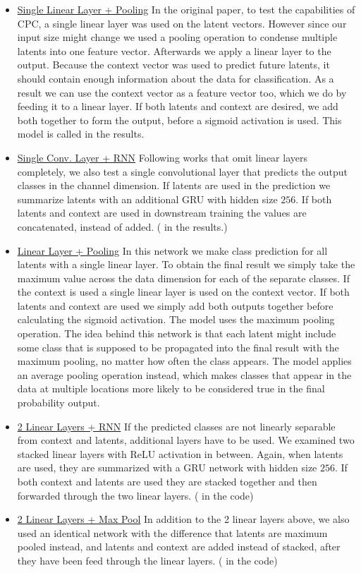 \begin{itemize}
	\item \underline{Single Linear Layer + Pooling} In the original paper, to test the capabilities of CPC, a single linear layer was used on the latent vectors. However since our input size might change we used a pooling operation to condense multiple latents into one feature vector. Afterwards we apply a linear layer to the output. Because the context vector was used to predict future latents, it should contain enough information about the data for classification. As a result we can use the context vector as a feature vector too, which we do by feeding it to a linear layer. If both latents and context are desired, we add both together to form the output, before a sigmoid activation is used. This model is called  in the results.
	\item \underline{Single Conv. Layer + RNN} Following works that omit linear layers completely, we also test a single convolutional layer that predicts the output classes in the channel dimension. If latents are used in the prediction we summarize latents with an additional GRU with hidden size $256$. If both latents and context are used in downstream training the values are concatenated, instead of added. ( in the results.)
	\item \underline{Linear Layer + Pooling} In this network we make class prediction for all latents with a single linear layer. To obtain the final result we simply take the maximum value across the data dimension for each of the separate classes. If the context is used a single linear layer is used on the context vector. If both latents and context are used we simply add both outputs together before calculating the sigmoid activation. The model  uses the maximum pooling operation. The idea behind this network is that each latent might include some class that is supposed to be propagated into the final result with the maximum pooling, no matter how often the class appears. The model  applies an average pooling operation instead, which makes classes that appear in the data at multiple locations more likely to be considered true in the final probability output.
	\item \underline{2 Linear Layers + RNN} If the predicted classes are not linearly separable from context and latents, additional layers have to be used. We examined two stacked linear layers with ReLU activation in between. Again, when latents are used, they are summarized with a GRU network with hidden size $256$. If both context and latents are used they are stacked together and then forwarded through the two linear layers. ( in the code)
	\item \underline{2 Linear Layers + Max Pool} In addition to the 2 linear layers above, we also used an identical network with the difference that latents are maximum pooled instead, and latents and context are added instead of stacked, after they have been feed through the linear layers. ( in the code)
\end{itemize}
